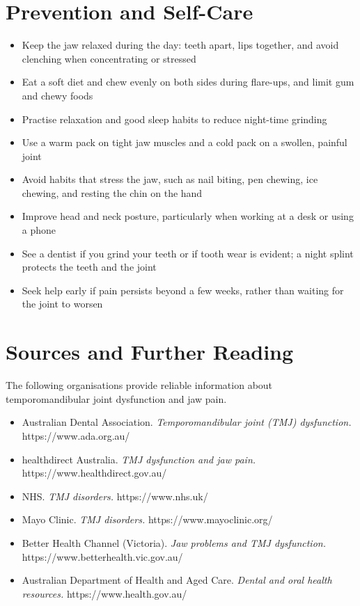 \section*{Prevention and Self-Care}
\begin{itemize}
    \item Keep the jaw relaxed during the day: teeth apart, lips together, and avoid clenching when concentrating or stressed
    \item Eat a soft diet and chew evenly on both sides during flare-ups, and limit gum and chewy foods
    \item Practise relaxation and good sleep habits to reduce night-time grinding
    \item Use a warm pack on tight jaw muscles and a cold pack on a swollen, painful joint
    \item Avoid habits that stress the jaw, such as nail biting, pen chewing, ice chewing, and resting the chin on the hand
    \item Improve head and neck posture, particularly when working at a desk or using a phone
    \item See a dentist if you grind your teeth or if tooth wear is evident; a night splint protects the teeth and the joint
    \item Seek help early if pain persists beyond a few weeks, rather than waiting for the joint to worsen
\end{itemize}

\section*{Sources and Further Reading}
The following organisations provide reliable information about temporomandibular joint dysfunction and jaw pain.

\begin{itemize}
    \item Australian Dental Association. \textit{Temporomandibular joint (TMJ) dysfunction.} https://www.ada.org.au/
    \item healthdirect Australia. \textit{TMJ dysfunction and jaw pain.} https://www.healthdirect.gov.au/
    \item NHS. \textit{TMJ disorders.} https://www.nhs.uk/
    \item Mayo Clinic. \textit{TMJ disorders.} https://www.mayoclinic.org/
    \item Better Health Channel (Victoria). \textit{Jaw problems and TMJ dysfunction.} https://www.betterhealth.vic.gov.au/
    \item Australian Department of Health and Aged Care. \textit{Dental and oral health resources.} https://www.health.gov.au/
\end{itemize}

\clearpage
